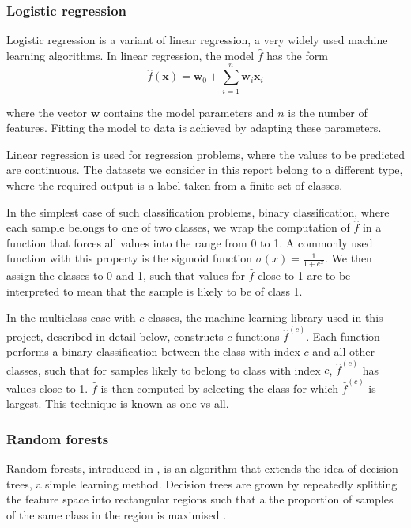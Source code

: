 \documentclass[a4paper,12pt,twoside,openright]{report}
\begin{document}
\subsubsection{Logistic regression}

Logistic regression is a variant of linear regression, a very widely used machine learning algorithms. In linear regression, the model $\hat{f}$ has the form
\begin{equation}
\hat{f}(\mathbf{x}) = \mathbf{w}_0 + \sum_{i=1}^n \mathbf{w}_i \mathbf{x}_i
\end{equation}

where the vector $\mathbf{w}$ contains the model parameters and $n$ is the number of features. Fitting the model to data is achieved by adapting these parameters.

Linear regression is used for regression problems, where the values to be predicted are continuous. The datasets we consider in this report belong to a different type, where the required output is a label taken from a finite set of classes.

In the simplest case of such classification problems, binary classification, where each sample belongs to one of two classes, we wrap the computation of $\hat{f}$ in a function that forces all values into the range from 0 to 1. A commonly used function with this property is the sigmoid function $\sigma(x) = \frac{1}{1+e^x}$. We then assign the classes to 0 and 1, such that values for $\hat{f}$ close to 1 are to be interpreted to mean that the sample is likely to be of class 1.

In the multiclass case with $c$ classes, the machine learning library used in this project, described in detail below, constructs $c$ functions $\hat{f}^{(c)}$. Each function performs a binary classification between the class with index $c$ and all other classes, such that for samples likely to belong to class with index $c$, $\hat{f}^{(c)}$ has values close to 1. $\hat{f}$ is then computed by selecting the class for which $\hat{f}^{(c)}$ is largest. This technique is known as one-vs-all.

\subsubsection{Random forests}
Random forests, introduced in \cite{rndforests}, is an algorithm that extends the idea of decision trees, a simple learning method. Decision trees are grown by repeatedly splitting the feature space into rectangular regions such that a the proportion of samples of the same class in the region is maximised \cite{james2014introduction}. 
\end{document}
